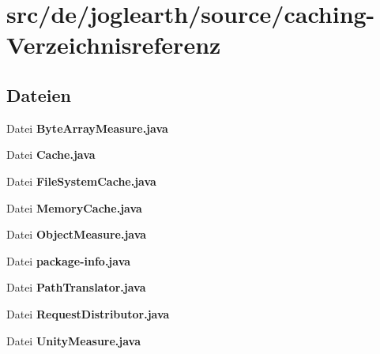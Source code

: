 \section{src/de/joglearth/source/caching-\/\-Verzeichnisreferenz}
\label{dir_95eec58bbe5a94d1e6c56ea6ed21690e}
\subsection*{Dateien}
\begin{DoxyCompactItemize}
\item 
Datei {\bfseries Byte\-Array\-Measure.\-java}
\item 
Datei {\bfseries Cache.\-java}
\item 
Datei {\bfseries File\-System\-Cache.\-java}
\item 
Datei {\bfseries Memory\-Cache.\-java}
\item 
Datei {\bfseries Object\-Measure.\-java}
\item 
Datei {\bfseries package-\/info.\-java}
\item 
Datei {\bfseries Path\-Translator.\-java}
\item 
Datei {\bfseries Request\-Distributor.\-java}
\item 
Datei {\bfseries Unity\-Measure.\-java}
\end{DoxyCompactItemize}
